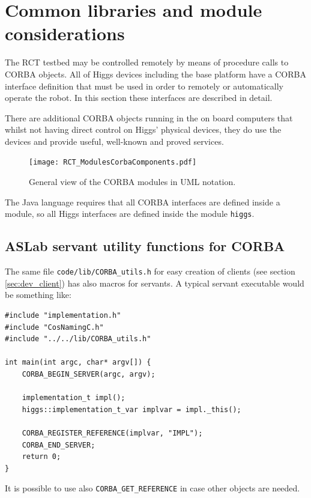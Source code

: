 
\section{Common libraries and module considerations}
\label{sec:devmanual_common}
The RCT testbed may be controlled remotely by means of procedure calls to CORBA objects.
All of Higgs devices including the base platform have a CORBA interface definition that must be
used in order to remotely or automatically operate the robot. In this section these interfaces
are described in detail.

There are additional CORBA objects running in the on board computers that whilst not having direct control on Higgs'
physical devices, they do use the devices and provide useful, well-known and proved services.

\begin{figure}
\begin{center}
 {\texttt{[image: RCT\_ModulesCorbaComponents.pdf]}}
\end{center}
\caption{General view of the CORBA modules in UML notation.}
\label{fig:ModulesCorbaComponents}
\end{figure}

The Java language requires that all CORBA interfaces are defined inside a module,
so all Higgs interfaces are defined inside the module \texttt{higgs}.


\subsection{ASLab servant utility functions for CORBA}
The same file \texttt{code/lib/CORBA\_utils.h} for easy creation of clients (see section \ref{sec:dev_client}) has also macros for servants.
A typical servant executable would be something like:

\begin{verbatim}
#include "implementation.h"
#include "CosNamingC.h"
#include "../../lib/CORBA_utils.h"

int main(int argc, char* argv[]) {
    CORBA_BEGIN_SERVER(argc, argv);

    implementation_t impl();
    higgs::implementation_t_var implvar = impl._this();

    CORBA_REGISTER_REFERENCE(implvar, "IMPL");
    CORBA_END_SERVER;
    return 0;
}
\end{verbatim} 
It is possible to use also \texttt{CORBA\_GET\_REFERENCE} in case other objects are needed.


